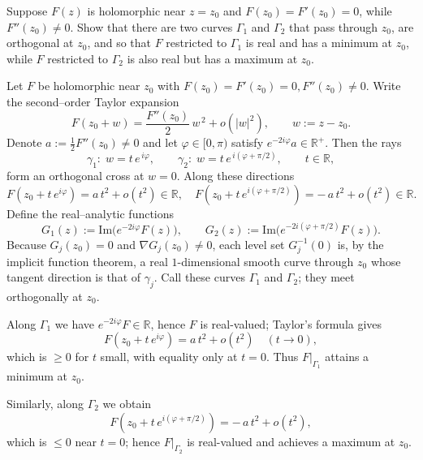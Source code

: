 \documentclass[12pt]{article}
\newcommand{\R}{\mathbb{R}}
\begin{document}
\begin{statement}[8.5.2]
  Suppose $F(z)$ is holomorphic near $z=z_0$ and $F(z_0)=F'(z_0)=0$, while $F''(z_0) \neq 0$. Show that 
  there are two curves $\Gamma_1$ and $\Gamma_2$ that pass through $z_0$, are orthogonal at 
  $z_0$, and so that $F$ restricted to $\Gamma_1$ is real and has a minimum at $z_0$, while $F$ 
  restricted to $\Gamma_2$ is also real but has a maximum at $z_0$. 
\end{statement}
\begin{newproof}
  Let $F$ be holomorphic near $z_0$ with $ F(z_0)=F'(z_0)=0, F''(z_0)\neq0. $ Write the second–order Taylor expansion
  $$F(z_0+w)=\frac{F''(z_0)}{2}\,w^{\,2}+o(|w|^{2}), \qquad w:=z-z_0.$$
  Denote $a:=\tfrac12F''(z_0)\neq0$ and let $\varphi\in[0,\pi)$ satisfy 
  $ e^{-2i\varphi}a\in\R^+. $  
  Then the rays  
  $$\gamma_1:\;w=t\,e^{\,i\varphi},\qquad 
    \gamma_2:\;w=t\,e^{\,i(\varphi+\pi/2)},\qquad t\in\R,$$ 
  form an orthogonal cross at $w=0$.  Along these directions
  $$
      F(z_0+t\,e^{i\varphi})
      =a\,t^{2}+o(t^{2})\in\R,\quad
      F(z_0+t\,e^{i(\varphi+\pi/2)})
      =-\,a\,t^{2}+o(t^{2})\in\R.
  $$
  Define the real–analytic functions  
  $$G_1(z):=\text{Im}(e^{-2i\varphi}F(z)\bigr),\qquad 
    G_2(z):=\text{Im}(e^{-2i(\varphi+\pi/2)}F(z)\bigr).$$  
  Because $G_j(z_0)=0$ and $\nabla G_j(z_0)\neq0$, each level set $G_j^{-1}(0)$ is, by the implicit function theorem, a real $1$-dimensional smooth curve through $z_0$ whose tangent direction is that of $\gamma_j$.  
  Call these curves $\Gamma_1$ and $\Gamma_2$; they meet orthogonally at $z_0$.

  \smallskip
  Along $\Gamma_1$ we have $e^{-2i\varphi}F\in\R$, hence $F$ is real-valued; Taylor’s formula gives  
  $$F(z_0+t\,e^{i\varphi})=a\,t^{2}+o(t^{2})\quad (t\to0),$$
  which is $\ge0$ for $t$ small, with equality only at $t=0$.  Thus $F|_{\Gamma_1}$ attains a minimum at $z_0$.

  Similarly, along $\Gamma_2$ we obtain  
  $$F(z_0+t\,e^{i(\varphi+\pi/2)})=-\,a\,t^{2}+o(t^{2}),$$
  which is $\le0$ near $t=0$; hence $F|_{\Gamma_2}$ is real-valued and achieves a maximum at $z_0$.
\end{newproof}
\end{document}
